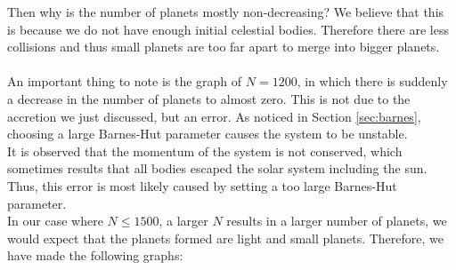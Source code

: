 Then why is the number of planets mostly non-decreasing? We believe that this is because we do not have enough initial celestial bodies. Therefore there are less collisions and thus small planets are too far apart to merge into bigger planets.\\
\\
An important thing to note is the graph of $N=1200$, in which there is suddenly a decrease in the number of planets to almost zero. This is not due to the accretion we just discussed, but an error. As noticed in Section \ref{sec:barnes}, choosing a large Barnes-Hut parameter causes the system to be unstable.\\
It is observed that the momentum of the system is not conserved, which sometimes results that all bodies escaped the solar system including the sun. Thus, this error is most likely caused by setting a too large Barnes-Hut parameter.
\\
In our case where $N\leq 1500$, a larger $N$ results in a larger number of planets, we would expect that the planets formed are light and small planets. Therefore, we have made the following graphs:
